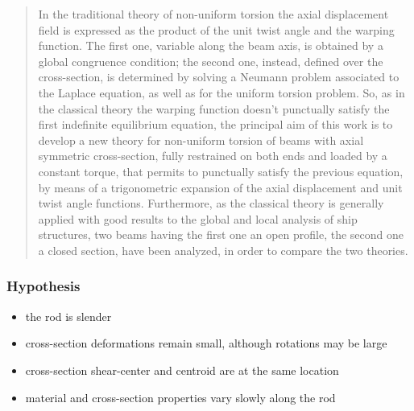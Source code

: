 \blockcquote{Campanile2009}{In the traditional theory of non-uniform torsion the axial displacement field is expressed as the product of the unit twist angle and the warping function. The first one, variable along the beam axis, is obtained by a global congruence condition; the second one, instead, defined over the cross-section, is determined by solving a Neumann problem associated to the Laplace equation, as well as for the uniform torsion problem. So, as in the classical theory the warping function doesn’t punctually satisfy the first indefinite equilibrium equation, the principal aim of this work is to develop a new theory for non-uniform torsion of beams with axial symmetric cross-section, fully restrained on both ends and loaded by a constant torque, that permits to punctually satisfy the previous equation, by means of a trigonometric expansion of the axial displacement and unit twist angle functions. Furthermore, as the classical theory is generally applied with good results to the global and local analysis of ship structures, two beams having the first one an open profile, the second one a closed section, have been analyzed, in order to compare the two theories.}

\subsubsection{Hypothesis}

\begin{itemize}
\item the rod is slender
\item cross-section deformations remain small, although rotations may be large
\item cross-section shear-center and centroid are at the same location
\item material and cross-section properties vary slowly along the rod
\end{itemize}

\clearpage

